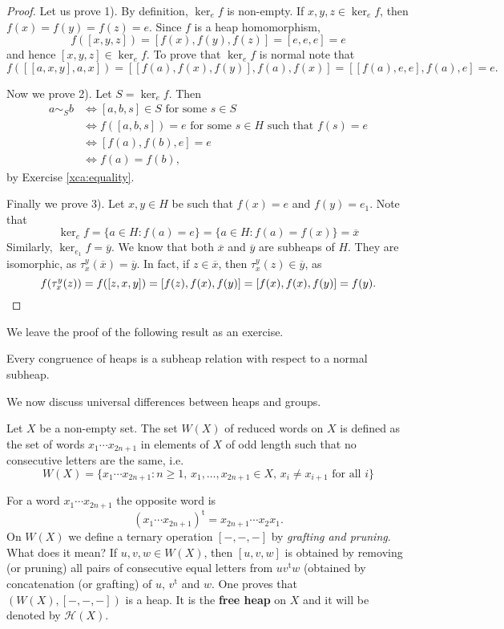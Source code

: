 \documentclass{svmult}
\begin{document}
\begin{proof}
    Let us prove 1). By definition, $\ker_ef$ is non-empty. If $x,y,z\in\ker_ef$, then 
    $f(x)=f(y)=f(z)=e$. Since $f$ is a heap homomorphism, 
    \[
    f([x,y,z])=[f(x),f(y),f(z)]=[e,e,e]=e
    \]
    and hence $[x,y,z]\in\ker_ef$. To prove that $\ker_ef$ is normal
    note that
    \[
    f\left(\left[ [a,x,y],a,x\right]\right)
    =\left[ [f(a),f(x),f(y)],f(a),f(x)\right]
    =\left[ [f(a),e, e],f(a),e\right]=e.
    \]
    
    Now we prove 2). Let $S=\ker_ef$. Then 
    \begin{align*}
        a\sim_Sb &\Longleftrightarrow [a,b,s]\in S\text{ for some $s\in S$}\\
        & \Longleftrightarrow f([a,b,s])=e\text{ for some $s\in H$ such that $f(s)=e$}\\
        & \Longleftrightarrow [f(a),f(b),e]=e\\
        & \Longleftrightarrow f(a)=f(b),
    \end{align*}
    by Exercise \ref{xca:equality}. 
    
    Finally we prove 3). Let $x,y\in H$ be such that $f(x)=e$ and $f(y)=e_1$. 
    Note that
    \[
    \ker_ef=\{a\in H:f(a)=e\}=\{a\in H:f(a)=f(x)\}=\overline{x}
    \]
    Similarly, $\ker_{e_1}f=\overline{y}$. We know that both $\overline{x}$ and
    $\overline{y}$ are subheaps of $H$. They are isomorphic, 
    as $\tau_x^y(\overline{x})=\overline{y}$. In fact, if $z\in\overline{x}$, 
    then $\tau_x^y(z)\in\overline{y}$, as 
    \[
    f(\tau_x^y(z))=f([z,x,y])=[f(z),f(x),f(y)]=[f(x),f(x),f(y)]=f(y).\qedhere 
    \]
\end{proof}

We leave the proof of the following result as an exercise. 

\begin{corollary}
    Every congruence of heaps is a subheap relation with respect to a normal subheap.  
\end{corollary}

We now discuss universal differences between heaps and groups. 

Let $X$ be a non-empty set. The set $W(X)$ of reduced words on $X$ 
is defined as the set of words 
$x_1\cdots x_{2n+1}$ in elements of $X$ of odd length such that no
consecutive letters are the same, i.e. 
\[
W(X)=\{x_1\cdots x_{2n+1}:n\geq1,\,x_1,\dots,x_{2n+1}\in X,\,x_i\ne x_{i+1}\text{ for all $i$}\}
\]

For a word $x_1\cdots x_{2n+1}$ the opposite 
word is 
\[
(x_1\cdots x_{2n+1})^{\operatorname{t}}=x_{2n+1}\cdots x_2x_1.
\]
On $W(X)$ we define a ternary operation $[-,-,-]$ by \emph{grafting and pruning}. What does it mean? 
If $u,v,w\in W(X)$, then $[u,v,w]$ is obtained by removing (or pruning) all 
pairs of consecutive equal letters from $uv^{\operatorname{t}}w$ (obtained by
concatenation (or grafting) of $u$, $v^{\operatorname{t}}$ and $w$. One
proves that $\left(W(X),[-,-,-]\right)$ is a heap. It is the \textbf{free heap} on 
$X$ and it will be denoted by $\mathcal{H}(X)$. 
\end{document}
